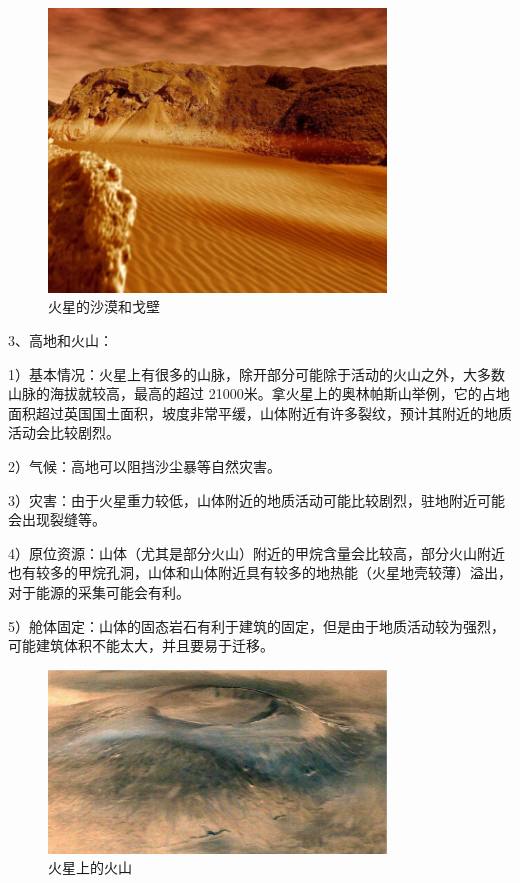 \begin{figure}[H]
  \includegraphics[width=0.8\textwidth]{figure/shamo-gebi.png}
  \centering
  \caption{火星的沙漠和戈壁}
\end{figure}


3、高地和火山：

1）基本情况：火星上有很多的山脉，除开部分可能除于活动的火山之外，大多数山脉的海拔就较高，最高的超过 21000米。拿火星上的奥林帕斯山举例，它的占地面积超过英国国土面积，坡度非常平缓，山体附近有许多裂纹，预计其附近的地质活动会比较剧烈。

2）气候：高地可以阻挡沙尘暴等自然灾害。

3）灾害：由于火星重力较低，山体附近的地质活动可能比较剧烈，驻地附近可能会出现裂缝等。

4）原位资源：山体（尤其是部分火山）附近的甲烷含量会比较高，部分火山附近也有较多的甲烷孔洞，山体和山体附近具有较多的地热能（火星地壳较薄）溢出，对于能源的采集可能会有利。

5）舱体固定：山体的固态岩石有利于建筑的固定，但是由于地质活动较为强烈，可能建筑体积不能太大，并且要易于迁移。

\begin{figure}[H]
  \includegraphics[width=0.8\textwidth]{figure/huoshan.png}
  \centering
  \caption{火星上的火山}
\end{figure}


